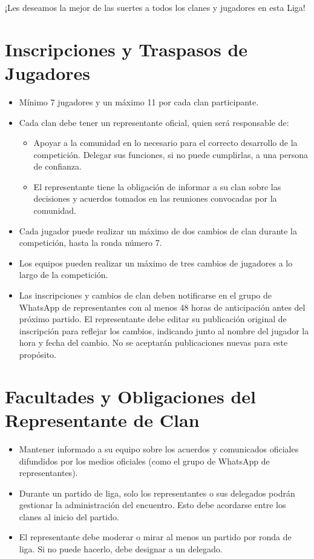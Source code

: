 \documentclass[a4paper, 11pt]{article}
\begin{document}
    ¡Les deseamos la mejor de las suertes a todos los clanes y jugadores en esta Liga!
    \clearpage

    \section{Inscripciones y Traspasos de Jugadores}
    
    \begin{itemize}
        \item Mínimo 7 jugadores y un máximo 11 por cada clan participante.
        \item Cada clan debe tener un representante oficial, quien será responsable de:
        \begin{itemize}
            \item Apoyar a la comunidad en lo necesario para el correcto desarrollo de la competición.
            Delegar sus funciones, si no puede cumplirlas, a una persona de confianza.
            \item El representante tiene la obligación de informar a su clan sobre las decisiones y acuerdos tomados en las reuniones convocadas por la comunidad.
        \end{itemize} 
                
        \item Cada jugador puede realizar un máximo de dos cambios de clan durante la competición, hasta la ronda número 7.
        \item Los equipos pueden realizar un máximo de tres cambios de jugadores a lo largo de la competición.
        \item Las inscripciones y cambios de clan deben notificarse en el grupo de WhatsApp de representantes con al menos 48 horas de anticipación antes del próximo partido.
        El representante debe editar su publicación original de inscripción para reflejar los cambios, indicando junto al nombre del jugador la hora y fecha del cambio. No se aceptarán publicaciones nuevas para este propósito.
      \end{itemize}
    \clearpage

    \section{Facultades y Obligaciones del Representante de Clan}
    
    \begin{itemize}
        \item Mantener informado a su equipo sobre los acuerdos y comunicados oficiales difundidos por los medios oficiales (como el grupo de WhatsApp de representantes).
        \item Durante un partido de liga, solo los representantes o sus delegados podrán gestionar la administración del encuentro. Esto debe acordarse entre los clanes al inicio del partido.
        \item El representante debe moderar o mirar al menos un partido por ronda de liga. Si no puede hacerlo, debe designar a un delegado.
    \end{itemize}
\end{document}
